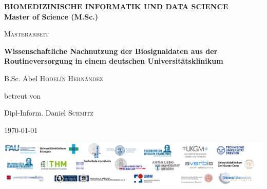 \begin{titlepage}
	\thispagestyle{firstpage}
	\raggedright
	{
		{\normalsize \color{orange} \bfseries BIOMEDIZINISCHE INFORMATIK UND DATA SCIENCE  \\}
		{\normalsize \color{gray} \bfseries Master of Science (M.Sc.)}
		\par
	}
	
	\vspace{1cm}
	
	\centering
	{\scshape\LARGE Masterarbeit \par}
	
	\vspace{1.5cm}
	{\huge \bfseries Wissenschaftliche Nachnutzung der Biosignaldaten aus der Routineversorgung in einem deutschen Universitätsklinikum \par}
	
	\vspace{2cm}
	{\Large B.Sc. Abel \textsc{Hodel\'in Hern\'andez}~\par}
	\vspace{2cm} 
	betreut von\par
	{Dipl-Inform. Daniel \textsc{Schmitz}\par}

	\vspace{2cm}

	{\large \today\par}
	
	\vfill
	
	\includegraphics[width=\textwidth]{figures/onder_document}
	
\end{titlepage}